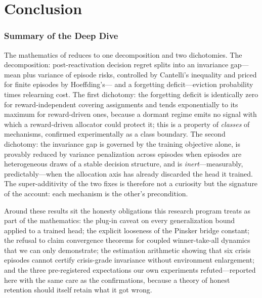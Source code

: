 
\part{Conclusion}

\section*{Summary of the Deep Dive}

The mathematics of \nm{} reduces to one decomposition and two
dichotomies. The decomposition: post-reactivation decision regret splits
into an invariance gap---mean plus variance of episode risks, controlled
by Cantelli's inequality and priced for finite episodes by Hoeffding's---
and a forgetting deficit---eviction probability times relearning cost.
The first dichotomy: the forgetting deficit is identically zero for
reward-independent covering assignments and tends exponentially to its
maximum for reward-driven ones, because a dormant regime emits no signal
with which a reward-driven allocator could protect it; this is a property
of \emph{classes} of mechanisms, confirmed experimentally as a class
boundary. The second dichotomy: the invariance gap is governed by the
training objective alone, is provably reduced by variance penalization
across episodes when episodes are heterogeneous draws of a stable
decision structure, and is \emph{inert}---measurably, predictably---when
the allocation axis has already discarded the head it trained. The
super-additivity of the two fixes is therefore not a curiosity but the
signature of the account: each mechanism is the other's precondition.

Around these results sit the honesty obligations this research program
treats as part of the mathematics: the plug-in caveat on every
generalization bound applied to a trained head; the explicit looseness of
the Pinsker bridge constant; the refusal to claim convergence theorems
for coupled winner-take-all dynamics that we can only demonstrate; the
estimation arithmetic showing that six crisis episodes cannot certify
crisis-grade invariance without environment enlargement; and the three
pre-registered expectations our own experiments refuted---reported here
with the same care as the confirmations, because a theory of honest
retention should itself retain what it got wrong.






